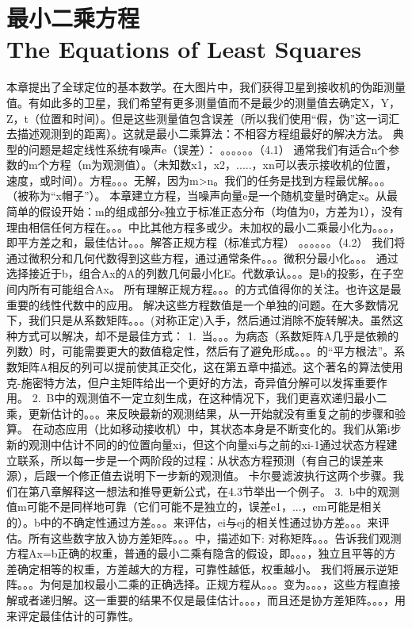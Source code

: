 \section[最小二乘方程]{最小二乘方程\\The Equations of Least Squares}
	本章提出了全球定位的基本数学。在大图片中，我们获得卫星到接收机的伪距测量值。有如此多的卫星，我们希望有更多测量值而不是最少的测量值去确定X，Y，Z，t（位置和时间）。但是这些测量值包含误差（所以我们使用“假，伪”这一词汇去描述观测到的距离）。这就是最小二乘算法：不相容方程组最好的解决方法。
	典型的问题是超定线性系统有噪声e（误差）：
	。。。。。。（4.1）
	通常我们有适合n个参数的m个方程（m为观测值）。（未知数x1，x2，.....，xn可以表示接收机的位置，速度，或时间）。方程。。。无解，因为m>n。我们的任务是找到方程最优解。。。（被称为“x帽子”）。
	本章建立方程，当噪声向量e是一个随机变量时确定x。从最简单的假设开始：m的组成部分e独立于标准正态分布（均值为0，方差为1），没有理由相信任何方程在。。。中比其他方程多或少。未加权的最小二乘最小化为。。。，即平方差之和，最佳估计。。。解答正规方程（标准式方程）
	。。。。。。（4.2）
	我们将通过微积分和几何代数得到这些方程，通过通常条件。。。微积分最小化。。。
	通过选择接近于b，组合Ax的A的列数几何最小化E。代数承认。。。是b的投影，在子空间内所有可能组合Ax。
	所有理解正规方程。。。的方式值得你的关注。也许这是最重要的线性代数中的应用。
	解决这些方程数值是一个单独的问题。在大多数情况下，我们只是从系数矩阵。。。(对称正定)入手，然后通过消除不旋转解决。虽然这种方式可以解决，却不是最佳方式：
	1. 当。。。为病态（系数矩阵A几乎是依赖的列数）时，可能需要更大的数值稳定性，然后有了避免形成。。。的“平方根法”。系数矩阵A相反的列可以提前使其正交化，这在第五章中描述。这个著名的算法使用克-施密特方法，但户主矩阵给出一个更好的方法，奇异值分解可以发挥重要作用。
	2. B中的观测值不一定立刻生成，在这种情况下，我们更喜欢递归最小二乘，更新估计的。。。来反映最新的观测结果，从一开始就没有重复之前的步骤和验算。
	在动态应用（比如移动接收机）中，其状态本身是不断变化的。我们从第i步新的观测中估计不同的的位置向量xi，但这个向量xi与之前的xi-1通过状态方程建立联系，所以每一步是一个两阶段的过程：从状态方程预测（有自己的误差来源），后跟一个修正值去说明下一步新的观测值。
	卡尔曼滤波执行这两个步骤。我们在第八章解释这一想法和推导更新公式，在4.3节举出一个例子。
	3. b中的观测值m可能不是同样地可靠（它们可能不是独立的，误差e1，...，em可能是相关的）。b中的不确定性通过方差。。。来评估，ei与ej的相关性通过协方差。。。来评估。所有这些数字放入协方差矩阵。。。中，描述如下:
	对称矩阵。。。告诉我们观测方程Ax=b正确的权重，普通的最小二乘有隐含的假设，即。。。，独立且平等的方差确定相等的权重，方差越大的方程，可靠性越低，权重越小。
	我们将展示逆矩阵。。。为何是加权最小二乘的正确选择。正规方程从。。。变为。。。，这些方程直接解或者递归解。这一重要的结果不仅是最佳估计。。。，而且还是协方差矩阵。。。，用来评定最佳估计的可靠性。
